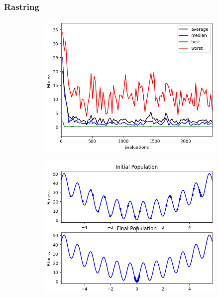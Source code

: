 \subsubsection{Rastring}
\begin{figure}[H]
    \centering
    \begin{subfigure}[t]{0.5\textwidth}
        \centering
        \includegraphics[width=\linewidth]{images/lab2/rast_eval.png}
    \end{subfigure}%
    \begin{subfigure}[t]{0.5\textwidth}
        \centering
        \includegraphics[width=\linewidth]{images/lab2/rast_pop.png}
    \end{subfigure}
\end{figure}
